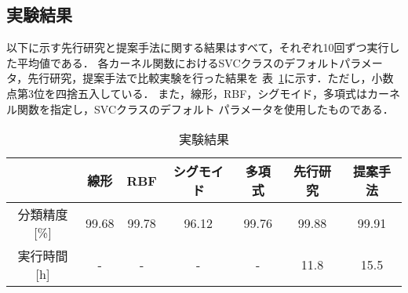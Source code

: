 \subsection{実験結果}
以下に示す先行研究と提案手法に関する結果はすべて，それぞれ10回ずつ実行した平均値である．
各カーネル関数におけるSVCクラスのデフォルトパラメータ，先行研究，提案手法で比較実験を行った結果を
表~\ref{result1}に示す．ただし，小数点第3位を四捨五入している．
また，線形，RBF，シグモイド，多項式はカーネル関数を指定し，SVCクラスのデフォルト
パラメータを使用したものである．
\begin{table}[b]
    \centering
    \caption{実験結果}  %
    \begin{tabular}{|c|c|c|c|c|c|c|}  %
        \hline  %
        ~ & 線形 &RBF &シグモイド&多項式&先行研究 & 提案手法\\  %
        \hline  %
        分類精度[\%]& 99.68&99.78&96.12&99.76&99.88& 99.91\\  %
        \hline  %
        実行時間[h] & - & -&-&-&11.8& 15.5\\  %
        \hline  %
    \end{tabular}
    \label{result1}  %
  \end{table}

